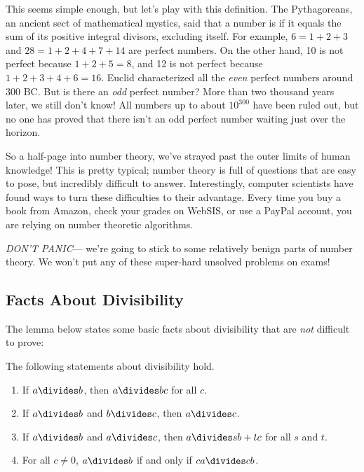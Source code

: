This seems simple enough, but let's play with this definition.  The
Pythagoreans, an ancient sect of mathematical mystics, said that a
number is  if it equals the sum of its positive
integral divisors, excluding itself.  For example, $6 = 1 + 2 + 3$
and $28 = 1 + 2 + 4 + 7 + 14$ are perfect numbers.  On the other hand,
10 is not perfect because $1 + 2 + 5 = 8$, and 12 is not perfect
because $1 + 2 + 3 + 4 + 6 = 16$.  Euclid characterized all the
\textit{even} perfect numbers around 300 BC.  But is there an
\textit{odd} perfect number?  More than two thousand years later, we
still don't know!  All numbers up to about $10^{300}$ have been ruled
out, but no one has proved that there isn't an odd perfect number
waiting just over the horizon.

So a half-page into number theory, we've strayed past the outer limits of
human knowledge!  This is pretty typical; number theory is full of
questions that are easy to pose, but incredibly difficult to answer.
Interestingly, computer scientists have found ways to turn these
difficulties to their advantage.  Every time you buy a book from Amazon,
check your grades on WebSIS, or use a PayPal account, you are relying on
number theoretic algorithms.

\textit{DON'T PANIC}--- we're going to stick to some relatively benign
parts of number theory.  We won't put any of these super-hard unsolved
problems on exams!

\subsection{Facts About Divisibility}

The lemma below states some basic facts about divisibility that are
\textit{not} difficult to prove:

\begin{lemma}
\label{lem:div}
The following statements about divisibility hold.
%
\begin{enumerate}
\item If $a \divides b$, then $a \divides bc$ for all $c$.
\item If $a \divides b$ and $b \divides c$, then $a \divides c$.
\item If $a \divides b$ and $a \divides c$, then $a \divides sb + tc$ for all $s$ and $t$.
\item For all $c \neq 0$, $a \divides b$ if and only if $ca \divides cb$.
\end{enumerate}
\end{lemma}

